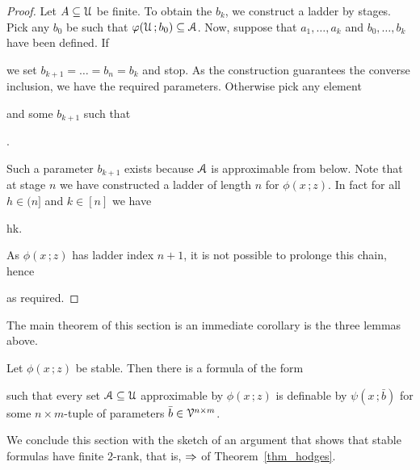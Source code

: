 \documentclass[scombinatorics.tex]{subfiles}
\begin{document}
\begin{proof}
  Let $A\subseteq\EuScript U$ be finite.
  To obtain the $b_k$, we construct a ladder by stages.
  Pick any $b_0$ be such that $\varphi(\EuScript U\,;b_0)\subseteq\EuScript A$.
  Now, suppose that $a_1,\dots,a_k$ and $b_0,\dots,b_k$ have been defined.
  If 
  \\[-1ex]

  we set $b_{k+1}=\dots=b_n=b_k$ and stop.
  As the construction guarantees the converse inclusion, we have the required parameters.
  Otherwise pick any element


  and some $b_{k+1}$ such that

  .

  Such a parameter $b_{k+1}$ exists because $\EuScript A$ is approximable from below.
  Note that at stage $n$ we have constructed a ladder of length $n$ for $\phi(x\,;z)$.
  In fact for all $h\in(n]$ and $k\in[n]$ we have
  
  {\IFF}
  {h\le k.}
  
  As $\phi(x\,;z)$ has ladder index $n+1$, it is not possible to prolonge this chain, hence


  as required.
\end{proof}
  
The main theorem of this section is an immediate corollary is the three lemmas above.

\begin{theorem}\label{thm_stable_definability}
  Let $\phi(x\,;z)$ be stable.
  Then there is a formula of the form

  
  such that every set $\EuScript A\subseteq\EuScript U$ approximable by  $\phi(x\,;z)$ is definable by $\psi(x\,;\bar b)$ for some $n{\times}m$-tuple of parameters $\bar b\in\EuScript V^{n\times m}$.\QED
\end{theorem}

We conclude this section with the sketch of an argument that shows that stable formulas have finite 2-rank, that is, $\Rightarrow$ of Theorem~\ref{thm_hodges}.


\end{document}
